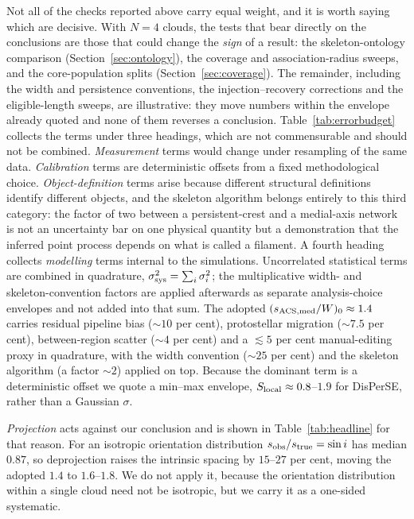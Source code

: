 \documentclass[usenatbib,twoside,twocolumn]{mnras}
\begin{document}
Not all of the checks reported above carry equal weight, and it is worth saying which are decisive. With $N=4$ clouds, the tests that bear directly on the conclusions are those that could change the \emph{sign} of a result: the skeleton-ontology comparison (Section~\ref{sec:ontology}), the coverage and association-radius sweeps, and the core-population splits (Section~\ref{sec:coverage}). The remainder, including the width and persistence conventions, the injection--recovery corrections and the eligible-length sweeps, are illustrative: they move numbers within the envelope already quoted and none of them reverses a conclusion. Table~\ref{tab:errorbudget} collects the terms under three headings, which are not commensurable and should not be combined. \emph{Measurement} terms would change under resampling of the same data. \emph{Calibration} terms are deterministic offsets from a fixed methodological choice. \emph{Object-definition} terms arise because different structural definitions identify different objects, and the skeleton algorithm belongs entirely to this third category: the factor of two between a persistent-crest and a medial-axis network is not an uncertainty bar on one physical quantity but a demonstration that the inferred point process depends on what is called a filament. A fourth heading collects \emph{modelling} terms internal to the simulations. Uncorrelated statistical terms are combined in quadrature, $\sigma_{\rm sys}^2=\sum_i\sigma_i^2$; the multiplicative width- and skeleton-convention factors are applied afterwards as separate analysis-choice envelopes and not added into that sum. The adopted $(s_{\rm ACS,med}/W)_0\approx1.4$ carries residual pipeline bias ($\sim10$ per cent), protostellar migration ($\sim7.5$ per cent), between-region scatter ($\sim4$ per cent) and a $\lesssim5$ per cent manual-editing proxy in quadrature, with the width convention ($\sim25$ per cent) and the skeleton algorithm (a factor $\sim2$) applied on top. Because the dominant term is a deterministic offset we quote a min--max envelope, $S_{\rm local}\approx0.8$--$1.9$ for DisPerSE, rather than a Gaussian $\sigma$.

\emph{Projection} acts against our conclusion and is shown in Table~\ref{tab:headline} for that reason. For an isotropic orientation distribution $s_{\rm obs}/s_{\rm true}=\sin i$ has median $0.87$, so deprojection raises the intrinsic spacing by $15$--$27$ per cent, moving the adopted $1.4$ to $1.6$--$1.8$. We do not apply it, because the orientation distribution within a single cloud need not be isotropic, but we carry it as a one-sided systematic.
\end{document}
